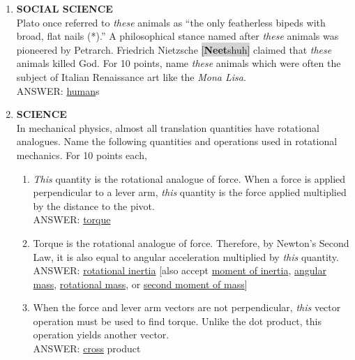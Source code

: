 \documentclass{report}
\newcommand*{\backtrack}{\setcounter{enumi}{\numexpr\theenumi-1\relax}}
\begin{document}
\begin{enumerate}
    \item \textbf{SOCIAL SCIENCE} \\ Plato once referred to \textit{these} animals as ``the only featherless bipeds with broad, flat nails (*).'' A philosophical stance named after \textit{these} animals was pioneered by Petrarch. Friedrich Nietzsche \colorbox{lightGray}{[\textbf{Neet}\textperiodcentered shuh]} claimed that \textit{these} animals killed God. For 10 points, name \textit{these} animals which were often the subject of Italian Renaissance art like the \textit{Mona Lisa}. \\ ANSWER: \underline{human}s \backtrack
    \item \textbf{SCIENCE} \\ In mechanical physics, almost all translation quantities have rotational analogues. Name the following quantities and operations used in rotational mechanics. For 10 points each,
    \begin{enumerate}[label=\Alph*]
        \item \textit{This} quantity is the rotational analogue of force. When a force is applied perpendicular to a lever arm, \textit{this} quantity is the force applied multiplied by the distance to the pivot. \\ ANSWER: \underline{torque}
        \item Torque is the rotational analogue of force. Therefore, by Newton's Second Law, it is also equal to angular acceleration multiplied by \textit{this} quantity. \\ ANSWER: \underline{rotational inertia} [also accept \underline{moment of inertia}, \underline{angular mass}, \underline{rotational mass}, or \underline{second moment of mass}]
        \item When the force and lever arm vectors are not perpendicular, \textit{this} vector operation must be used to find torque. Unlike the dot product, this operation yields another vector. \\ ANSWER: \underline{cross} product
    \end{enumerate} 


\end{enumerate}
\end{document}
